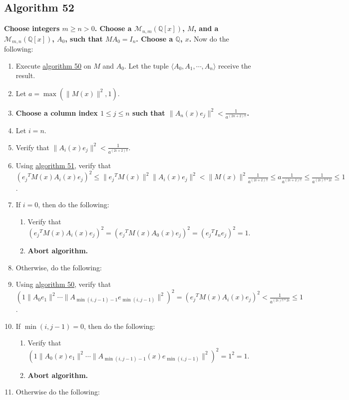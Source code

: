 \documentclass[twocolumn]{article}
\begin{document}
		\subsection{Algorithm 52}\label{sec:algorithm 52}
			\textbf{Choose integers $m\ge n>0$. Choose a $\mathcal{M}_{n,m}(\mathbb{Q}[x])$, $M$, and a $\mathcal{M}_{m,n}(\mathbb{Q}[x])$, $A_0$, such that $MA_0=I_n$. Choose a $\mathbb{Q}$, $x$.} Now do the following:
			\begin{enumerate}
				\item Execute \hyperref[sec:algorithm 50]{algorithm 50} on $M$ and $A_0$. Let the tuple $\langle A_0,A_1,\cdots,A_n\rangle$ receive the result.
				\item Let $a=\max(\lVert M(x)\rVert^2,1)$.
				\item \textbf{Choose a column index $1\le j\le n$ such that $\lVert A_n(x)e_j\rVert^2<\frac{1}{a^{(2n+2)!!}}$.}
				\item Let $i=n$.
				\item Verify that $\lVert A_i(x)e_j\rVert^2<\frac{1}{a^{(2i+2)!!}}$.
				\item Using \hyperref[sec:algorithm 51]{algorithm 51}, verify that $({e_j}^TM(x)A_i(x)e_j)^2\le\lVert{e_j}^TM(x)\rVert^2\lVert A_i(x)e_j\rVert^2<\lVert M(x)\rVert^2\frac{1}{a^{(2i+2)!!}}\le a\frac{1}{a^{(2i+2)!!}}\le\frac{1}{a^{(2i)!!*2i}}\le 1$.
				\item If $i=0$, then do the following:
				\begin{enumerate}
					\item Verify that $({e_j}^TM(x)A_i(x)e_j)^2=({e_j}^TM(x)A_0(x)e_j)^2=({e_j}^TI_ne_j)^2=1$.
					\item \textbf{Abort algorithm.}
				\end{enumerate}
				\item Otherwise, do the following:
				\item Using \hyperref[sec:algorithm 50]{algorithm 50}, verify that $(1\lVert A_0e_1\rVert^2\cdots\lVert A_{\min(i,j-1)-1}e_{\min(i,j-1)}\rVert^2)^2=({e_j}^TM(x)A_i(x)e_j)^2<\frac{1}{a^{(2i)!!*2i}}\le 1$.
				\item If $\min(i,j-1)=0$, then do the following:
				\begin{enumerate}
					\item Verify that $(1\lVert A_0(x)e_1\rVert^2\cdots\allowbreak\lVert A_{\min(i,j-1)-1}(x)e_{\min(i,j-1)}\rVert^2)^2=1^2=1$.
					\item \textbf{Abort algorithm.}
				\end{enumerate}
				\item Otherwise do the following:

\end{enumerate}
\end{document}
